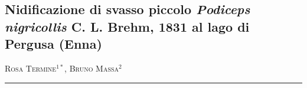 \setcounter{figure}{0}
\setcounter{table}{0}

\begin{adjustwidth}{-3.5cm}{0cm}
\pagestyle{CIOpage}
\chapter*[Nidificazione di svasso piccolo]{Nidificazione di svasso piccolo \textbf{\textit{Podiceps
nigricollis}}\textbf{ C. L. Brehm, 1831 al lago di Pergusa (Enna)}}

\textsc{Rosa Termine}$^{1*}$, \textsc{Bruno Massa}$^{2}$ \\

 
\noindent\color{MUSEBLUE}\rule{27cm}{2pt}
\vspace{1cm}
\end{adjustwidth}



